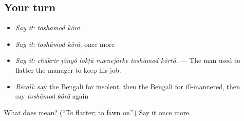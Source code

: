 \subsection*{Your turn}
\begin{itemize}
\raggedright
  \item \emph{Say it:} \emph{toshāmod kôrā}
  \item \emph{Say it:} \emph{toshāmod kôrā}, once more
  \item \emph{Say it:} \emph{chākrir jônyô lokṭā mænejārke toshāmod kôrtô.} — The man used to flatter the manager to keep his job.
  \item \emph{Recall:} say the Bengali for insolent, then the Bengali for ill-mannered, then say \emph{toshāmod kôrā} again
\end{itemize}

\begin{tcolorbox}[breakable,colback=teal!4,colframe=teal!35!black,title={Before you move on}]
What does   mean? (\textquotedblleft{}To flatter; to fawn on\textquotedblright{}.) Say it once more.
\end{tcolorbox}
